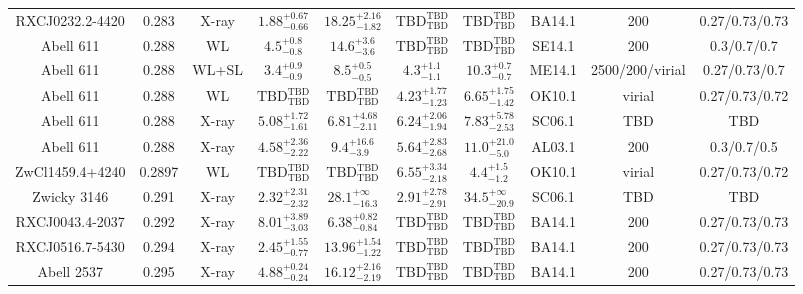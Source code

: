\begin{table}
\begin{tabular}{cccccccccc}
RXCJ0232.2-4420 & 0.283 & X-ray & ${1.88}^{+0.67}_{-0.66}$ & ${18.25}^{+2.16}_{-1.82}$ & ${\mathrm{TBD}}^{\mathrm{TBD}}_{\mathrm{TBD}}$ & ${\mathrm{TBD}}^{\mathrm{TBD}}_{\mathrm{TBD}}$ & BA14.1 & 200 & 0.27/0.73/0.73 \\
Abell 611 & 0.288 & WL & ${4.5}^{+0.8}_{-0.8}$ & ${14.6}^{+3.6}_{-3.6}$ & ${\mathrm{TBD}}^{\mathrm{TBD}}_{\mathrm{TBD}}$ & ${\mathrm{TBD}}^{\mathrm{TBD}}_{\mathrm{TBD}}$ & SE14.1 & 200 & 0.3/0.7/0.7 \\
Abell 611 & 0.288 & WL+SL & ${3.4}^{+0.9}_{-0.9}$ & ${8.5}^{+0.5}_{-0.5}$ & ${4.3}^{+1.1}_{-1.1}$ & ${10.3}^{+0.7}_{-0.7}$ & ME14.1 & 2500/200/virial & 0.27/0.73/0.7 \\
Abell 611 & 0.288 & WL & ${\mathrm{TBD}}^{\mathrm{TBD}}_{\mathrm{TBD}}$ & ${\mathrm{TBD}}^{\mathrm{TBD}}_{\mathrm{TBD}}$ & ${4.23}^{+1.77}_{-1.23}$ & ${6.65}^{+1.75}_{-1.42}$ & OK10.1 & virial & 0.27/0.73/0.72 \\
Abell 611 & 0.288 & X-ray & ${5.08}^{+1.72}_{-1.61}$ & ${6.81}^{+4.68}_{-2.11}$ & ${6.24}^{+2.06}_{-1.94}$ & ${7.83}^{+5.78}_{-2.53}$ & SC06.1 & TBD & TBD \\
Abell 611 & 0.288 & X-ray & ${4.58}^{+2.36}_{-2.22}$ & ${9.4}^{+16.6}_{-3.9}$ & ${5.64}^{+2.83}_{-2.68}$ & ${11.0}^{+21.0}_{-5.0}$ & AL03.1 & 200 & 0.3/0.7/0.5 \\
ZwCl1459.4+4240 & 0.2897 & WL & ${\mathrm{TBD}}^{\mathrm{TBD}}_{\mathrm{TBD}}$ & ${\mathrm{TBD}}^{\mathrm{TBD}}_{\mathrm{TBD}}$ & ${6.55}^{+3.34}_{-2.18}$ & ${4.4}^{+1.5}_{-1.2}$ & OK10.1 & virial & 0.27/0.73/0.72 \\
Zwicky 3146 & 0.291 & X-ray & ${2.32}^{+2.31}_{-2.32}$ & ${28.1}^{+\infty}_{-16.3}$ & ${2.91}^{+2.78}_{-2.91}$ & ${34.5}^{+\infty}_{-20.9}$ & SC06.1 & TBD & TBD \\
RXCJ0043.4-2037 & 0.292 & X-ray & ${8.01}^{+3.89}_{-3.03}$ & ${6.38}^{+0.82}_{-0.84}$ & ${\mathrm{TBD}}^{\mathrm{TBD}}_{\mathrm{TBD}}$ & ${\mathrm{TBD}}^{\mathrm{TBD}}_{\mathrm{TBD}}$ & BA14.1 & 200 & 0.27/0.73/0.73 \\
RXCJ0516.7-5430 & 0.294 & X-ray & ${2.45}^{+1.55}_{-0.77}$ & ${13.96}^{+1.54}_{-1.22}$ & ${\mathrm{TBD}}^{\mathrm{TBD}}_{\mathrm{TBD}}$ & ${\mathrm{TBD}}^{\mathrm{TBD}}_{\mathrm{TBD}}$ & BA14.1 & 200 & 0.27/0.73/0.73 \\
Abell 2537 & 0.295 & X-ray & ${4.88}^{+0.24}_{-0.24}$ & ${16.12}^{+2.16}_{-2.19}$ & ${\mathrm{TBD}}^{\mathrm{TBD}}_{\mathrm{TBD}}$ & ${\mathrm{TBD}}^{\mathrm{TBD}}_{\mathrm{TBD}}$ & BA14.1 & 200 & 0.27/0.73/0.73 \\

\end{tabular}
\end{table}
